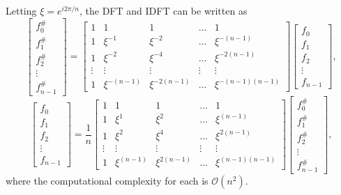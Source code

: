 \documentclass{beamer}
\begin{document}
\begin{frame}
	Letting $\xi = e^{i2\pi/n}$, the DFT and IDFT can be written as
	\begin{equation*}
		\begin{bmatrix}
			f_{0}^{\#} \\
			f_{1}^{\#} \\
			f_{2}^{\#} \\
			\vdots \\
			f_{n-1}^{\#}
		\end{bmatrix}
		=
		\begin{bmatrix}
			1 & 1 & 1 & \dots & 1 \\
			1 & \xi^{-1} & \xi^{-2} & \dots & \xi^{-(n-1)} \\
			1 & \xi^{-2} & \xi^{-4} & \dots & \xi^{-2(n-1)} \\
			\vdots & \vdots & \vdots & \vdots & \vdots \\
			1 & \xi^{-(n-1)} & \xi^{-2(n-1)} & \dots & \xi^{-(n-1)(n-1)} 
		\end{bmatrix}
		\begin{bmatrix}
			f_{0} \\
			f_{1} \\
			f_{2} \\
			\vdots \\
			f_{n-1}
		\end{bmatrix},
	\end{equation*}
	\begin{equation*}
		\begin{bmatrix}
			f_{0} \\
			f_{1} \\
			f_{2} \\
			\vdots \\
			f_{n-1}
		\end{bmatrix}
		=
		\frac{1}{n}
		\begin{bmatrix}
			1 & 1 & 1 & \dots & 1 \\
			1 & \xi^{1} & \xi^{2} & \dots & \xi^{(n-1)} \\
			1 & \xi^{2} & \xi^{4} & \dots & \xi^{2(n-1)} \\
			\vdots & \vdots & \vdots & \vdots & \vdots \\
			1 & \xi^{(n-1)} & \xi^{2(n-1)} & \dots & \xi^{(n-1)(n-1)} 
		\end{bmatrix}
		\begin{bmatrix}
			f_{0}^{\#} \\
			f_{1}^{\#} \\
			f_{2}^{\#} \\
			\vdots \\
			f_{n-1}^{\#}
		\end{bmatrix},
	\end{equation*}
	where the computational complexity for each is $\mathcal{O}(n^2)$.
\end{frame}
\end{document}
